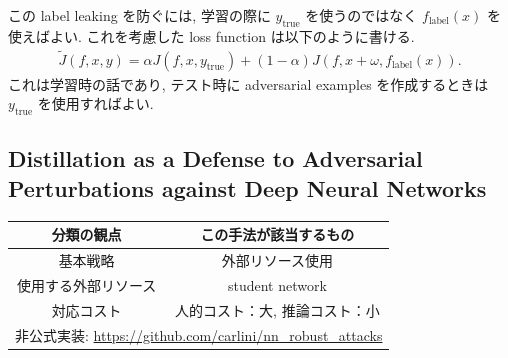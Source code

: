 この label leaking を防ぐには, 学習の際に $y_{\text{true}}$ を使うのではなく $f_{\text{label}} (x)$ を使えばよい.
これを考慮した loss function は以下のように書ける.
%
\begin{eqnarray}
\tilde{J} (f, x, y) = \alpha J (f, x, y_{\text{true}}) + (1 - \alpha) J (f, x + \omega, f_{\text{label}} (x)).
\label{eq:explaining-and-loss-model-prediction}
\end{eqnarray}
%
これは学習時の話であり, テスト時に adversarial examples を作成するときは $y_{\text{true}}$ を使用すればよい.



\subsection{Distillation as a Defense to Adversarial Perturbations against Deep Neural Networks}
\label{subsec:distillation-as}
%
\begin{table}[htbp]
\begin{center}
\begin{tabular}{|c|c|}
\hline
分類の観点 & この手法が該当するもの \\
\hline
基本戦略 & 外部リソース使用 \\
使用する外部リソース & student network \\
対応コスト & 人的コスト：大, 推論コスト：小 \\
\hline
\multicolumn{2}{|c|}{非公式実装: \href{https://github.com/carlini/nn_robust_attacks}{https://github.com/carlini/nn\_robust\_attacks}} \\
\hline
\end{tabular}
\label{tb:distillation-as-summary}
\end{center}
\end{table}
%

